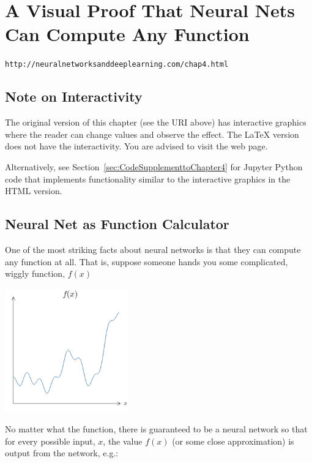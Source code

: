 
\chapter{A Visual Proof That Neural Nets Can Compute Any Function}
\label{sec:AVisualProofThatNeuralNetsCanComputeAnyFunction}

\lstinline{http://neuralnetworksanddeeplearning.com/chap4.html}

\section*{Note on Interactivity}

The original version of this chapter (see the URI above) has interactive graphics where the reader can change values and observe the effect. The \LaTeX{} version does not have the interactivity. You are advised to visit the web page.  

Alternatively, see Section~\ref{sec:CodeSupplementtoChapter4} for Jupyter Python code that implements functionality similar to the interactive graphics in the HTML version.

\section{Neural Net as Function Calculator}

One of the most striking facts about neural networks is that they can compute any function at all. That is, suppose someone hands you some complicated, wiggly function, $f(x)$

{\centering \includegraphics[width=0.4\textwidth,]{pic/wigglyfn01.png} \par}

No matter what the function, there is guaranteed to be a neural network so that for every possible input, $x$, the value $f(x)$ (or some close approximation) is output from the network, e.g.:

